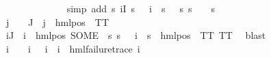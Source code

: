 \begin{isabellebody}
\ \ \ \ \ \ \ \ \ \ \ \ \isamarkupfalse%
\ {\isacharparenleft}{\kern0pt}simp\ add{\isacharcolon}{\kern0pt}\ {\isacartoucheopen}{\isasymforall}s{\isachardot}{\kern0pt}\ {\isacharparenleft}{\kern0pt}{\isasymforall}i{\isasymin}I{\isachardot}{\kern0pt}\ s\ {\isasymTurnstile}\ {\isasymPhi}\ i{\isacharparenright}{\kern0pt}\ {\isacharequal}{\kern0pt}\ {\isacharparenleft}{\kern0pt}s\ {\isasymTurnstile}\ {\isasymphi}{\isacharparenright}{\kern0pt}{\isacartoucheclose}\ {\isacartoucheopen}{\isasymforall}s{\isachardot}{\kern0pt}\ {\isacharparenleft}{\kern0pt}s\ {\isasymTurnstile}\ {\isasymphi}{\isacharparenright}{\kern0pt}\ {\isacharequal}{\kern0pt}\ {\isacharparenleft}{\kern0pt}s\ {\isasymTurnstile}\ {\isasympsi}{\isacharparenright}{\kern0pt}{\isacartoucheclose}{\isacharparenright}{\kern0pt}\isanewline
\ \ \ \ \ \ \ \ \ \ \isamarkupfalse%
\ {\isachardoublequoteopen}{\isasymforall}j\ {\isasymin}\ {\isasymPsi}\ {\isacharbackquote}{\kern0pt}\ J{\isachardot}{\kern0pt}\ {\isasymexists}{\isasymalpha}{\isachardot}{\kern0pt}\ j\ {\isacharequal}{\kern0pt}\ {\isacharparenleft}{\kern0pt}hml{\isacharunderscore}{\kern0pt}pos\ {\isasymalpha}\ TT{\isacharparenright}{\kern0pt}{\isachardoublequoteclose}\ \isanewline
\ \ \ \ \ \ \ \ \ \ \ \ \isamarkupfalse%
\ {\isacartoucheopen}{\isasymforall}i{\isasymin}J{\isachardot}{\kern0pt}\ {\isasymPsi}\ i\ {\isacharequal}{\kern0pt}\ hml{\isacharunderscore}{\kern0pt}pos\ {\isacharparenleft}{\kern0pt}SOME\ {\isasymalpha}{\isachardot}{\kern0pt}\ {\isasymforall}s{\isachardot}{\kern0pt}\ {\isacharparenleft}{\kern0pt}s\ {\isasymTurnstile}\ {\isasymPhi}\ i{\isacharparenright}{\kern0pt}\ {\isacharequal}{\kern0pt}\ {\isacharparenleft}{\kern0pt}s\ {\isasymTurnstile}\ hml{\isacharunderscore}{\kern0pt}pos\ {\isasymalpha}\ TT{\isacharparenright}{\kern0pt}{\isacharparenright}{\kern0pt}\ TT{\isacartoucheclose}\ \isamarkupfalse%
\ blast\isanewline
\ \ \ \ \ \ \ \ \ \ \isamarkupfalse%
\ {\isachardoublequoteopen}{\isacharparenleft}{\kern0pt}{\isasymexists}i\ {\isasymin}\ {\isasymPsi}\ {\isacharbackquote}{\kern0pt}\ {\isacharbraceleft}{\kern0pt}i{\isacharunderscore}{\kern0pt}{\isasymphi}{\isacharbraceright}{\kern0pt}{\isachardot}{\kern0pt}\ {\isasymPsi}\ {\isacharbackquote}{\kern0pt}\ {\isacharbraceleft}{\kern0pt}i{\isacharunderscore}{\kern0pt}{\isasymphi}{\isacharbraceright}{\kern0pt}\ {\isacharequal}{\kern0pt}\ {\isacharbraceleft}{\kern0pt}i{\isacharbraceright}{\kern0pt}\ {\isasymand}\ hml{\isacharunderscore}{\kern0pt}failure{\isacharunderscore}{\kern0pt}trace\ i{\isacharparenright}{\kern0pt}{\isachardoublequoteclose}\isanewline

\end{isabellebody}
